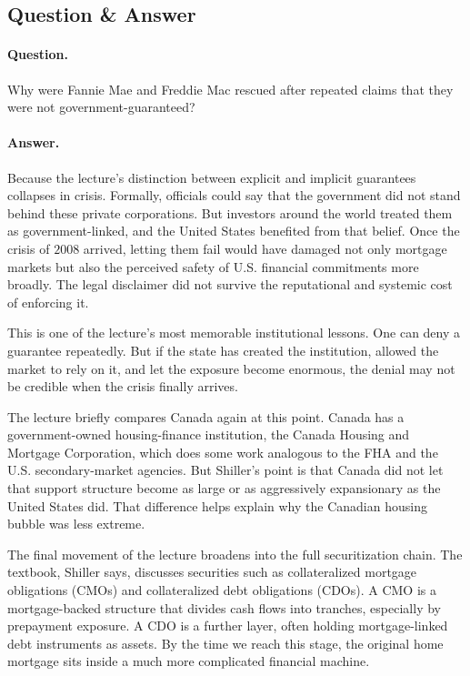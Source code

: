 \subsection{Question \& Answer}

\paragraph{Question.} Why were Fannie Mae and Freddie Mac rescued after repeated claims that they were not government-guaranteed?

\paragraph{Answer.} Because the lecture's distinction between explicit and implicit guarantees collapses in crisis. Formally, officials could say that the government did not stand behind these private corporations. But investors around the world treated them as government-linked, and the United States benefited from that belief. Once the crisis of \(2008\) arrived, letting them fail would have damaged not only mortgage markets but also the perceived safety of U.S. financial commitments more broadly. The legal disclaimer did not survive the reputational and systemic cost of enforcing it.

This is one of the lecture's most memorable institutional lessons. One can deny a guarantee repeatedly. But if the state has created the institution, allowed the market to rely on it, and let the exposure become enormous, the denial may not be credible when the crisis finally arrives.

The lecture briefly compares Canada again at this point. Canada has a government-owned housing-finance institution, the Canada Housing and Mortgage Corporation, which does some work analogous to the FHA and the U.S. secondary-market agencies. But Shiller's point is that Canada did not let that support structure become as large or as aggressively expansionary as the United States did. That difference helps explain why the Canadian housing bubble was less extreme.

The final movement of the lecture broadens into the full securitization chain. The textbook, Shiller says, discusses securities such as collateralized mortgage obligations (CMOs) and collateralized debt obligations (CDOs). A CMO is a mortgage-backed structure that divides cash flows into tranches, especially by prepayment exposure. A CDO is a further layer, often holding mortgage-linked debt instruments as assets. By the time we reach this stage, the original home mortgage sits inside a much more complicated financial machine.

